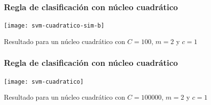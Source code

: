 \documentclass[dvipsnames, pdflatex,slidecentered]{beamer}
\begin{document}
\begin{frame}[plain]
\frametitle{Regla de clasificación con núcleo cuadrático}



\begin{center}
\texttt{[image: svm-cuadratico-sim-b]}
\end{center}


Resultado para un núcleo cuadrático con $C=100$, $m=2$ y $c=1$
\end{frame}

\begin{frame}[plain]
\frametitle{Regla de clasificación con núcleo cuadrático}



\begin{center}
\texttt{[image: svm-cuadratico]}
\end{center}


Resultado para un núcleo cuadrático con $C=100000$, $m=2$ y $c=1$
\end{frame}
\end{document}
